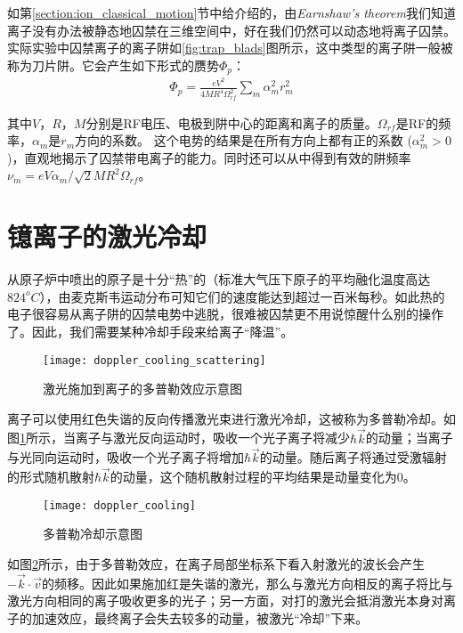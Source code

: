 如第\ref{section:ion_classical_motion}节中给介绍的，由\emph{Earnshaw's theorem}\cite[]{Earnshaw}我们知道离子没有办法被静态地囚禁在三维空间中，好在我们仍然可以动态地将离子囚禁。实际实验中囚禁离子的离子阱如\ref{fig:trap_blads}图所示，这中类型的离子阱一般被称为刀片阱。它会产生如下形式的赝势$\Phi_p$：
\begin{align}
    \Phi_p=\frac{eV^2}{4MR^4\Omega_{rf}^2}\sum_{m}^{}\alpha_m^2r_m^2
\end{align}

其中$V$，$R$，$M$分别是RF电压、电极到阱中心的距离和离子的质量。$\Omega_{rf}$是RF的频率，$\alpha_m$是$r_m$方向的系数。
这个电势的结果是在所有方向上都有正的系数 ($\alpha_m^2>0$)，直观地揭示了囚禁带电离子的能力。同时还可以从中得到有效的阱频率$\nu_m=eV\alpha_m/\sqrt{2}MR^2\Omega_{rf}$。

\section[镱离子的激光冷却]{镱离子的激光冷却\label{section:yb_laser_cooling}}
从原子炉中喷出的原子是十分“热”的（标准大气压下原子的平均融化温度高达$824 ^o C$），由麦克斯韦运动分布可知它们的速度能达到超过一百米每秒。如此热的电子很容易从离子阱的囚禁电势中逃脱，很难被囚禁更不用说惊醒什么别的操作了。因此，我们需要某种冷却手段来给离子“降温”。

\begin{figure}
    \centering
    \caption[激光施加到离子的多普勒效应示意图]{激光施加到离子的多普勒效应示意图\label{fig:doppler_cooling_scattering}}
    \texttt{[image: doppler\_cooling\_scattering]}
\end{figure}
离子可以使用红色失谐的反向传播激光束进行激光冷却，这被称为多普勒冷却\cite[]{Hänsch_Schawlow_1975}。如图\ref{fig:doppler_cooling_scattering}所示，当离子与激光反向运动时，吸收一个光子离子将减少$\hbar \vec{k}$的动量；当离子与光同向运动时，吸收一个光子离子将增加$\hbar \vec{k}$的动量。随后离子将通过受激辐射的形式随机散射$\hbar \vec{k}$的动量，这个随机散射过程的平均结果是动量变化为$0$。

\begin{figure}
    \centering
    \caption[多普勒冷却示意图]{多普勒冷却示意图\label{fig:doppler_cooling}}
    \texttt{[image: doppler\_cooling]}
\end{figure}
如图\ref{fig:doppler_cooling}所示，由于多普勒效应，在离子局部坐标系下看入射激光的波长会产生$-\vec{k}\cdot\vec{v}$的频移。因此如果施加红是失谐的激光，那么与激光方向相反的离子将比与激光方向相同的离子吸收更多的光子；另一方面，对打的激光会抵消激光本身对离子的加速效应，最终离子会失去较多的动量，被激光“冷却”下来。


